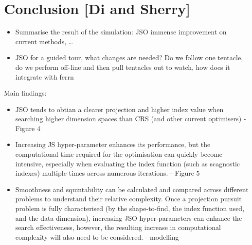 \documentclass[
  number,
  preprint,
  3p]{elsarticle}
\providecommand{\tightlist}{%
  \setlength{\itemsep}{0pt}\setlength{\parskip}{0pt}}\usepackage{longtable,booktabs,array}
\begin{document}
\endgroup{}

\section{Conclusion {[}Di and Sherry{]}}\label{sec-conclusion}

\begin{itemize}
\tightlist
\item
  Summarise the result of the simulation: JSO immense improvement on
  current methods, \ldots{}
\item
  JSO for a guided tour, what changes are needed? Do we follow one
  tentacle, do we perform off-line and then pull tentacles out to watch,
  how does it integrate with ferrn
\end{itemize}

Main findings:

\begin{itemize}
\item
  JSO tends to obtian a clearer projection and higher index value when
  searching higher dimension spaces than CRS (and other current
  optimisers) - Figure 4
\item
  Increasing JS hyper-parameter enhances its performance, but the
  computational time required for the optimisation can quickly become
  intensive, especially when evaluating the index function (such as
  scagnostic indexes) multiple times across numerous iterations. -
  Figure 5
\item
  Smoothness and squintability can be calculated and compared across
  different problems to understand their relative complexity. Once a
  projection pursuit problem is fully characterised (by the
  shape-to-find, the index function used, and the data dimension),
  increasing JSO hyper-parameters can enhance the search effectiveness,
  however, the resulting increase in computational complexity will also
  need to be considered. - modelling
\end{itemize}


\renewcommand\refname{References}
  
\end{document}
